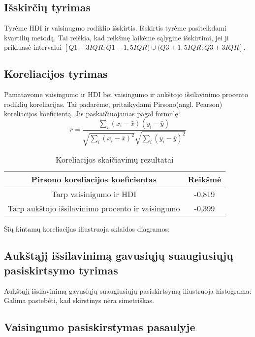 \subsection{Išskirčių tyrimas}
Tyrėme HDI ir vaisinugmo rodiklio išskirtis.
Išskirtis tyrėme pasitelkdami kvartilių metodą. Tai reiškia, kad reikšmę laikėme sąlygine išskirtimi, jei ji prikluasė intervalui $[Q1-3IQR; Q1-1,5IQR) \cup (Q3+1,5IQR; Q3+3IQR]$.

\subsection{Koreliacijos tyrimas}
Pamatavome vaisingumo ir HDI bei vaisingumo ir aukštojo išsilavinimo procento rodiklių koreliacijas. Tai padarėme, pritaikydami Pirsono(angl. Pearson) koreliacijos koeficientą. Jis paskaičiuojamas pagal formulę: 
\begin{equation}
r = \frac{\sum\limits_i (x_i - \bar{x})(y_i - \bar{y})}{\sqrt{\sum\limits_i(x_i - \bar{x})^2}\sqrt{\sum\limits_i(y_i - \bar{y})^2}}
\end{equation}

\begin{table}[h!]
\begin{center}
    \begin{tabular}{|c|c|}
        \hline
        \textbf{Pirsono koreliacijos koeficientas} & \textbf{Reikšmė} \\\hline
        Tarp vaisinigumo ir HDI & -0,819 \\\hline
        Tarp aukštojo išsilavinimo procento ir vaisingumo & -0,399 \\\hline
    \end{tabular}
    \caption{Koreliacijos skaičiavimų rezultatai}
\end{center}
\end{table}

Šių kintamų koreliacijas iliustruoja sklaidos diagramos:

\subsection{Aukštąjį išsilavinimą gavusiųjų suaugiusiųjų pasiskirtsymo tyrimas} 

Aukštąjį išsilavinimą gavusiųjų suaugiusiųjų pasiskirtsymą iliustruoja histograma: \\

Galima pastebėti, kad skirstinys nėra simetriškas.

\subsection{Vaisingumo pasiskirstymas pasaulyje}
